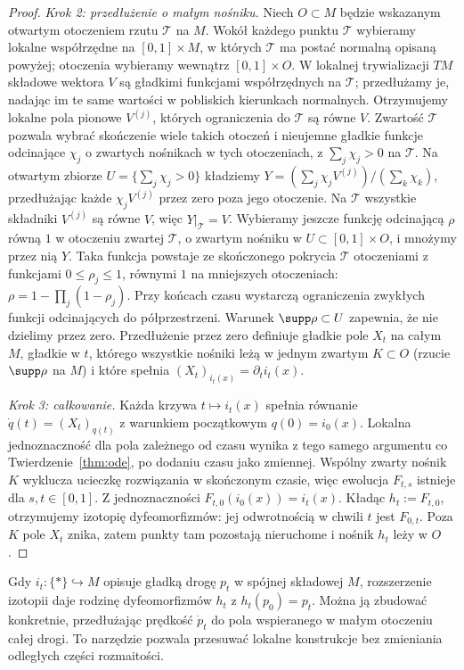 \begin{proof}
\emph{Krok 2: przedłużenie o małym nośniku.}
Niech $O\subset M$ będzie wskazanym otwartym otoczeniem
rzutu $\mathcal T$ na $M$. Wokół każdego punktu
$\mathcal T$ wybieramy lokalne współrzędne na
$[0,1]\times M$, w których $\mathcal T$ ma postać
normalną opisaną powyżej; otoczenia wybieramy wewnątrz
$[0,1]\times O$. W lokalnej trywializacji $TM$
składowe wektora $V$ są gładkimi funkcjami współrzędnych
na $\mathcal T$; przedłużamy je, nadając im te same
wartości w pobliskich kierunkach normalnych.
Otrzymujemy lokalne pola pionowe $V^{(j)}$, których
ograniczenia do $\mathcal T$ są równe $V$.
Zwartość $\mathcal T$ pozwala wybrać skończenie wiele
takich otoczeń i nieujemne gładkie funkcje odcinające $\chi_j$
o zwartych nośnikach w tych otoczeniach, z
$\sum_j\chi_j>0$ na $\mathcal T$.
Na otwartym zbiorze $U=\{\sum_j\chi_j>0\}$ kładziemy
$Y=(\sum_j\chi_j V^{(j)})/(\sum_k\chi_k)$,
przedłużając każde $\chi_j V^{(j)}$ przez zero poza jego otoczenie.
Na $\mathcal T$ wszystkie składniki $V^{(j)}$ są równe
$V$, więc $Y|_{\mathcal T}=V$.
Wybieramy jeszcze funkcję odcinającą $\rho$ równą $1$ w
otoczeniu zwartej $\mathcal T$, o zwartym nośniku
w $U\subset[0,1]\times O$, i mnożymy przez nią $Y$.
Taka funkcja powstaje ze skończonego pokrycia $\mathcal T$
otoczeniami z funkcjami $0\le\rho_j\le1$, równymi $1$
na mniejszych otoczeniach: $\rho=1-\prod_j(1-\rho_j)$.
Przy końcach czasu wystarczą ograniczenia zwykłych funkcji
odcinających do półprzestrzeni. Warunek $\supp\rho\subset U$
zapewnia, że nie dzielimy przez zero.
Przedłużenie przez zero definiuje gładkie pole $X_t$
na całym $M$, gładkie w $t$, którego wszystkie nośniki
leżą w jednym zwartym $K\subset O$ (rzucie $\supp\rho$ na $M$)
i które spełnia
$(X_t)_{i_t(x)}=\partial_t i_t(x)$.

\emph{Krok 3: całkowanie.} Każda krzywa
$t\mapsto i_t(x)$ spełnia równanie
$\dot q(t)=(X_t)_{q(t)}$ z warunkiem początkowym
$q(0)=i_0(x)$. Lokalna jednoznaczność dla pola zależnego
od czasu wynika z tego samego argumentu co
Twierdzenie~\ref{thm:ode}, po dodaniu czasu jako zmiennej.
Wspólny zwarty nośnik $K$ wyklucza ucieczkę rozwiązania
w skończonym czasie, więc ewolucja $F_{t,s}$ istnieje
dla $s,t\in[0,1]$. Z jednoznaczności
$F_{t,0}(i_0(x))=i_t(x)$. Kładąc $h_t:=F_{t,0}$,
otrzymujemy izotopię dyfeomorfizmów:
jej odwrotnością w chwili $t$ jest $F_{0,t}$.
Poza $K$ pole $X_t$ znika, zatem punkty tam pozostają
nieruchome i nośnik $h_t$ leży w $O$.
\end{proof}

\begin{przyklad}
Gdy $i_t\colon\{*\}\hookrightarrow M$ opisuje gładką drogę
$p_t$ w spójnej składowej $M$, rozszerzenie izotopii daje
rodzinę dyfeomorfizmów $h_t$ z $h_t(p_0)=p_t$.
Można ją zbudować konkretnie, przedłużając prędkość
$\dot p_t$ do pola wspieranego w małym otoczeniu całej drogi.
To narzędzie pozwala przesuwać lokalne konstrukcje
bez zmieniania odległych części rozmaitości.
\end{przyklad}


